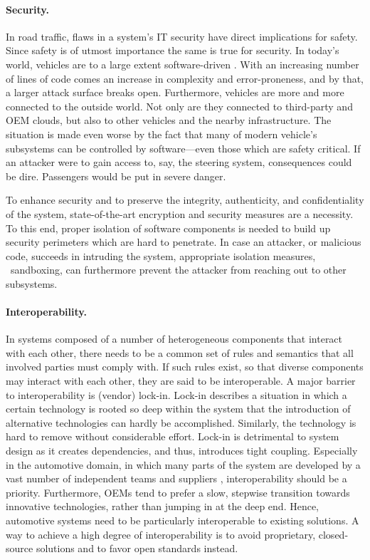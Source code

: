 \paragraph{Security.}
In road traffic, flaws in a system's IT security have direct implications for safety. Since safety is of utmost importance the same is true for security. In today's world, vehicles are to a large extent software-driven \cite{broy2006challenges}. With an increasing number of lines of code comes an increase in complexity and error-proneness, and by that, a larger attack surface breaks open. Furthermore, vehicles are more and more connected to the outside world. Not only are they connected to third-party and OEM clouds, but also to other vehicles and the nearby infrastructure. The situation is made even worse by the fact that many of modern vehicle's subsystems can be controlled by software---even those which are safety critical.	 If an attacker were to gain access to, say, the steering system, consequences could be dire. Passengers would be put in severe danger.

To enhance security and to preserve the integrity, authenticity, and confidentiality of the system, state-of-the-art encryption and security measures are a necessity. To this end, proper isolation of software components is needed to build up security perimeters which are hard to penetrate. In case an attacker, or malicious code, succeeds in intruding the system, appropriate isolation measures, \ie\ sandboxing, can furthermore prevent the attacker from reaching out to other subsystems.

\paragraph{Interoperability.} 
In systems composed of a number of heterogeneous components that interact with each other, there needs to be a common set of rules and semantics that all involved parties must comply with. If such rules exist, so that diverse components may interact with each other, they are said to be interoperable.
A major barrier to interoperability is (vendor) lock-in. Lock-in describes a situation in which a certain technology is rooted so deep within the system that the introduction of alternative technologies can hardly be accomplished. Similarly, the technology is hard to remove without considerable effort. Lock-in is detrimental to system design as it creates dependencies, and thus, introduces tight coupling. Especially in the automotive domain, in which many parts of the system are developed by a vast number of independent teams and suppliers \cite{broy2006challenges}, interoperability should be a priority. Furthermore, OEMs tend to prefer a slow, stepwise transition towards innovative technologies, rather than jumping in at the deep end. Hence, automotive systems need to be particularly interoperable to existing solutions. A way to achieve a high degree of interoperability is to avoid proprietary, closed-source solutions and to favor open standards instead.

